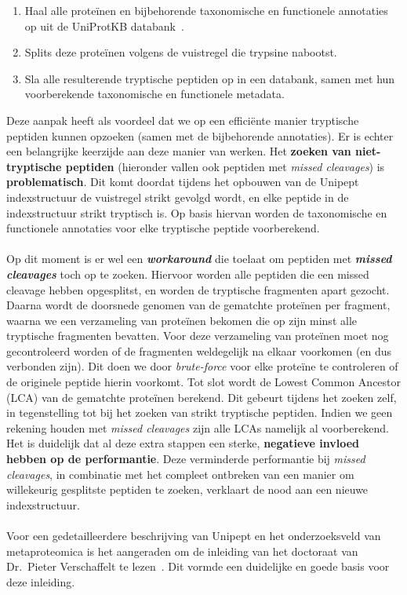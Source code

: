\begin{enumerate}
    \item Haal alle proteïnen en bijbehorende taxonomische en functionele annotaties op uit de UniProtKB databank~\cite{UniprotKB}.
    \item Splits deze proteïnen volgens de vuistregel die trypsine nabootst.
    \item Sla alle resulterende tryptische peptiden op in een databank, samen met hun voorberekende taxonomische en functionele metadata.
\end{enumerate}

Deze aanpak heeft als voordeel dat we op een efficiënte manier tryptische peptiden kunnen opzoeken (samen met de bijbehorende annotaties).
Er is echter een belangrijke keerzijde aan deze manier van werken.
Het \textbf{zoeken van niet-tryptische peptiden} (hieronder vallen ook peptiden met \textit{missed cleavages}) is \textbf{problematisch}.
Dit komt doordat tijdens het opbouwen van de Unipept indexstructuur de vuistregel strikt gevolgd wordt, en elke peptide in de indexstructuur strikt tryptisch is.
Op basis hiervan worden de taxonomische en functionele annotaties voor elke tryptische peptide voorberekend.
\\ \\
Op dit moment is er wel een \textbf{\textit{workaround}} die toelaat om peptiden met \textbf{\textit{missed cleavages}} toch op te zoeken.
Hiervoor worden alle peptiden die een missed cleavage hebben opgesplitst, en worden de tryptische fragmenten apart gezocht.
Daarna wordt de doorsnede genomen van de gematchte proteïnen per fragment, waarna we een verzameling van proteïnen bekomen die op zijn minst alle tryptische fragmenten bevatten.
Voor deze verzameling van proteïnen moet nog gecontroleerd worden of de fragmenten weldegelijk na elkaar voorkomen (en dus verbonden zijn).
Dit doen we door \textit{brute-force} voor elke proteïne te controleren of de originele peptide hierin voorkomt.
Tot slot wordt de Lowest Common Ancestor (LCA) van de gematchte proteïnen berekend.
Dit gebeurt tijdens het zoeken zelf, in tegenstelling tot bij het zoeken van strikt tryptische peptiden.
Indien we geen rekening houden met \textit{missed cleavages} zijn alle LCAs namelijk al voorberekend.
Het is duidelijk dat al deze extra stappen een sterke, \textbf{negatieve invloed hebben op de performantie}.
Deze verminderde performantie bij \textit{missed cleavages}, in combinatie met het compleet ontbreken van een manier om willekeurig gesplitste peptiden te zoeken, verklaart de nood aan een nieuwe indexstructuur.
\\ \\
Voor een gedetailleerdere beschrijving van Unipept en het onderzoeksveld van metaproteomica is het aangeraden om de inleiding van het doctoraat van Dr.~Pieter Verschaffelt te lezen~\cite{phdPieterUnipept}.
Dit vormde een duidelijke en goede basis voor deze inleiding.


